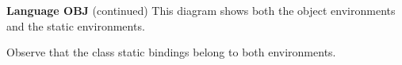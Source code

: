\begin{minipage}[t]{\sw}
\slidenumber
\LARGE
{\bf Language OBJ} (continued)\exx
This diagram shows both the object environments
and the static environments.\exx
\centerline{}
Observe that the class static bindings belong
to both environments.
\end{minipage}
